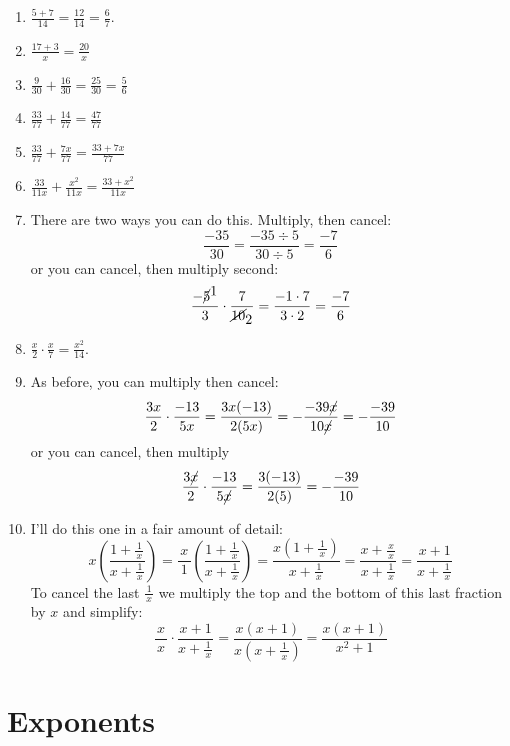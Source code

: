 \documentclass[oneside]{book}
\newcommand{\sfrac}[2]{\frac{\,#1\,}{#2}}
\theoremstyle{definition}
\theoremstyle{solution}
\newtheorem*{solution}{Solution}
\newenvironment{solution}{\vspace{2in}\comment}{\endcomment}
\begin{document}
\begin{solution}
\begin{enumerate}
\item $\frac{5+7}{14} = \frac{12}{14} = \frac{6}{7}$.

\item $\frac{17+3}{x}= \frac{20}{x}$

\item $\frac{9}{30} + \frac{16}{30} = \frac{25}{30} = \frac{5}{6}$

\item $\frac{33}{77} + \frac{14}{77} = \frac{47}{77}$

\item $\frac{33}{77} + \frac{7x}{77} = \frac{33+7x}{77}$

\item $\frac{33}{11x}+\frac{x^2}{11x} = \frac{33+x^2}{11x}$

\item There are two ways you can do this.  Multiply, then cancel: 
$$
\frac{-35}{30} = \frac{-35\div 5}{30\div 5} = \frac{-7}{6}
$$ 
or you can cancel, then multiply second:
  $$
\frac{-\cancel{5}^{\textstyle 1}}{3}\cdot
  \frac{7}{\cancel{10}_{\textstyle{2}}}
=\frac{-1\cdot 7}{3\cdot 2}=\frac{-7}{6}
$$

\item $\frac{x}{2}\cdot \frac{x}{7} = \frac{x^2}{14}$.

\item As before, you can multiply then cancel:
$$
\frac{3x}{2}\cdot \frac{-13}{5x} = \frac{3x(-13)}{2(5x)} =
  -\frac{-39\cancel x}{10\cancel x} = -\frac{-39}{10}
$$
or you can cancel, then multiply
$$
\frac{3\cancel{x}}{2}\cdot \frac{-13}{5\cancel{x}} = \frac{3(-13)}{2(5)} =
-\frac{-39}{10}
$$

\item I'll do this one in a fair amount of detail:
  $$
x\left(\frac{1+\sfrac 1x}{x+\sfrac 1x}\right) = \sfrac{x}{1}
  \left(\frac{1+\sfrac 1x}{x+\sfrac 1x}\right) = \frac{x\left(1+\sfrac
      1x\right)}{x+\sfrac 1x} = \frac{x+\sfrac xx}{x+\sfrac{1}{x}} =
  \frac{x+1}{x+\sfrac 1x}
$$
  To cancel the last $\sfrac 1x$ we multiply
  the top and the bottom of this last fraction by $x$ and simplify:
  $$
\sfrac xx \cdot \frac{x+1}{x+\sfrac 1x} =
  \frac{x(x+1)}{x\left(x+\sfrac 1x\right)} = \frac{x(x+1)}{x^2+1}
$$

\end{enumerate}
\end{solution}


\section{Exponents}
\end{document}
